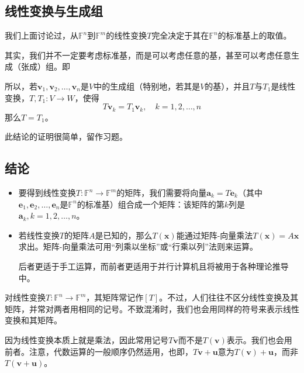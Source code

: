 \subsection{线性变换与生成组}

我们上面讨论过，从$\mathbb{F}^n$到$\mathbb{F}^m$的线性变换$T$完全决定于其在$\mathbb{F}^n$的标准基上的取值。

其实，我们并不一定要考虑标准基，而是可以考虑任意的基，甚至可以考虑任意生成（张成）组。即
\begin{center}
\end{center}
所以，若$\mathbf{v}_{1},\mathbf{v}_{2},\ldots,\mathbf{v}_{n}$是$V$中的生成组（特别地，若其是$V$的基），并且$T$与$T_1$是线性变换，$T,T_1:V\to W$，使得\[T\mathbf{v}_k=T_1\mathbf{v}_k,\quad k=1,2,\ldots,n\]
那么$T=T_1$。

此结论的证明很简单，留作习题。

\subsection{结论}

\begin{itemize}
    \item 要得到线性变换$T:\mathbb{F}^{n}\to\mathbb{F}^{m}$的矩阵，我们需要将向量$\mathbf{a}_{k}=T\mathbf{e}_{k}$（其中$\mathbf{e}_1,\mathbf{e}_2,\ldots,\mathbf{e}_n$是$\mathbb{F}^n$的标准基）组合成一个矩阵：该矩阵的第$k$列是$\mathbf{a}_{k},k=1,2,\dots,n$。
    \item 若线性变换$T$的矩阵$A$是已知的，那么$T(\mathbf{x})$能通过矩阵-向量乘法$T(\mathbf{x})=A\mathbf{x}$求出。矩阵-向量乘法可用“列乘以坐标”或“行乘以列”法则来运算。
    
    后者更适于手工运算，而前者更适用于并行计算机且将被用于各种理论推导中。
\end{itemize}

对线性变换$T:\mathbb{F}^{n}\to\mathbb{F}^{m}$，其矩阵常记作$[T]$。不过，人们往往不区分线性变换及其矩阵，并常对两者用相同的记号。不致混淆时，我们也会用同样的符号来表示线性变换和其矩阵。

因为线性变换本质上就是乘法，因此常用记号$T\mathbf{v}$而不是$T(\mathbf{v})$表示。我们也会用前者。注意，代数运算的一般顺序仍然适用，也即，$T\mathbf{v}+\mathbf{u}$意为$T(\mathbf{v})+\mathbf{u}$，而非$T(\mathbf{v}+\mathbf{u})$。

